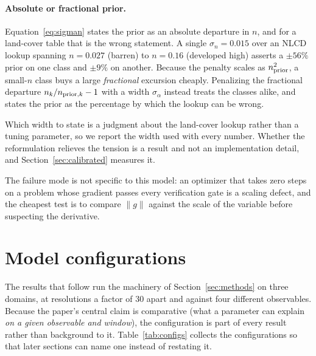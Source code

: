 \documentclass[11pt]{article}
\begin{document}
\paragraph{Absolute or fractional prior.}
Equation~\eqref{eq:sigman} states the prior as an absolute departure in
$n$, and for a land-cover table that is the wrong statement. A single
$\sigma_n = 0.015$ over an NLCD lookup spanning $n = 0.027$ (barren) to
$n = 0.16$ (developed high) asserts a $\pm 56\%$ prior on one class and
$\pm 9\%$ on another. Because the penalty scales as $n_{\rm prior}^2$,
a small-$n$ class buys a large \emph{fractional} excursion cheaply.
Penalizing the fractional departure $n_k/n_{{\rm prior},k} - 1$ with a width
$\sigma_\alpha$ instead treats the classes alike, and states the prior
as the percentage by which the lookup can be wrong.

Which width to state is a judgment about the land-cover lookup rather
than a tuning parameter, so we report the width used with every
number. Whether the reformulation relieves the tension is a result and
not an implementation detail, and Section~\ref{sec:calibrated}
measures it.

The failure mode is not specific to this model: an optimizer that
takes zero steps on a problem whose gradient passes every verification
gate is a scaling defect, and the cheapest test is to compare
$\lVert g \rVert$ against the scale of the variable before suspecting
the derivative.

\section{Model configurations}
\label{sec:configs}

The results that follow run the machinery of Section~\ref{sec:methods}
on three domains, at resolutions a factor of $30$ apart and against
four different observables. Because the paper's central claim
is comparative (what a parameter can explain \emph{on a given
observable and window}), the configuration is part of every result
rather than background to it. Table~\ref{tab:configs} collects the
configurations so that later sections can name one instead of
restating it.
\end{document}
